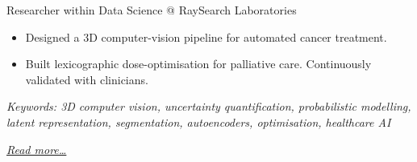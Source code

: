 \large{Researcher within Data Science @ RaySearch Laboratories}

\normalsize
\begin{itemize}
    \item Designed a 3D computer-vision pipeline for automated cancer treatment.
    \item Built lexicographic dose-optimisation for palliative care. Continuously validated with clinicians.
\end{itemize}

{\footnotesize\textit{Keywords: 3D computer vision, uncertainty quantification, probabilistic modelling, latent representation, segmentation, autoencoders, optimisation, healthcare AI}}

\hfill{\small{\textit{\hyperref[sec:raysearch]{Read more…}}}}

